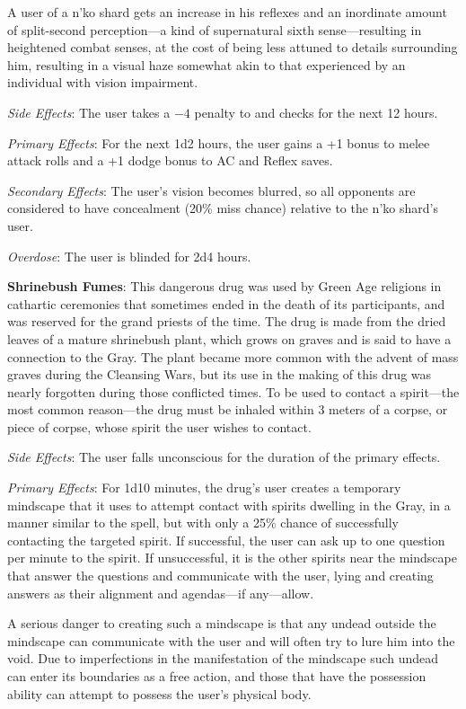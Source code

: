 A user of a n'ko shard gets an increase in his reflexes and an inordinate amount of split-second perception---a kind of supernatural sixth sense---resulting in heightened combat senses, at the cost of being less attuned to details surrounding him, resulting in a visual haze somewhat akin to that experienced by an individual with vision impairment.

\textit{Side Effects}: The user takes a $-4$ penalty to  and  checks for the next 12 hours.

\textit{Primary Effects}: For the next 1d2 hours, the user gains a +1 bonus to melee attack rolls and a +1 dodge bonus to AC and Reflex saves.

\textit{Secondary Effects}: The user's vision becomes blurred, so all opponents are considered to have concealment (20\% miss chance) relative to the n'ko shard's user.

\textit{Overdose}: The user is blinded for 2d4 hours.

\textbf{Shrinebush Fumes}: This dangerous drug was used by Green Age religions in cathartic ceremonies that sometimes ended in the death of its participants, and was reserved for the grand priests of the time. The drug is made from the dried leaves of a mature shrinebush plant, which grows on graves and is said to have a connection to the Gray. The plant became more common with the advent of mass graves during the Cleansing Wars, but its use in the making of this drug was nearly forgotten during those conflicted times. To be used to contact a spirit---the most common reason---the drug must be inhaled within 3 meters of a corpse, or piece of corpse, whose spirit the user wishes to contact.

\textit{Side Effects}: The user falls unconscious for the duration of the primary effects.

\textit{Primary Effects}: For 1d10 minutes, the drug's user creates a temporary mindscape that it uses to attempt contact with spirits dwelling in the Gray, in a manner similar to the  spell, but with only a 25\% chance of successfully contacting the targeted spirit. If successful, the user can ask up to one question per minute to the spirit. If unsuccessful, it is the other spirits near the mindscape that answer the questions and communicate with the user, lying and creating answers as their alignment and agendas---if any---allow.

A serious danger to creating such a mindscape is that any undead outside the mindscape can communicate with the user and will often try to lure him into the void. Due to imperfections in the manifestation of the mindscape such undead can enter its boundaries as a free action, and those that have the possession ability can attempt to possess the user's physical body.

